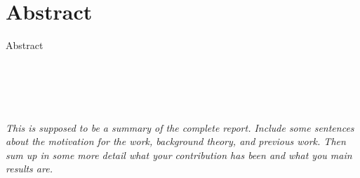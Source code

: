\section*{Abstract}
Abstract
\\\\\\\\\\



\noindent
\textit{\color{red}\\
This is supposed to be a summary of the complete report. Include some sentences about the motivation for the work, background theory, and previous work. Then sum up in some more detail what your contribution has been and what you main results are. }\\
\clearpage
